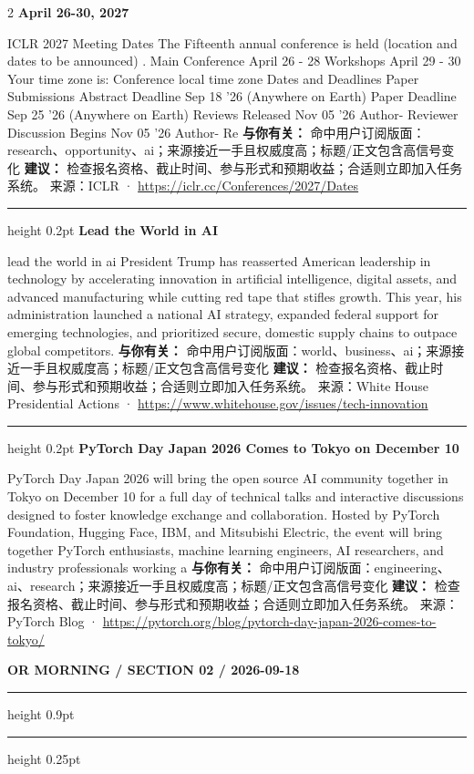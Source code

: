 \documentclass[10.5pt]{ctexart}
\begin{document}
\begin{multicols}{2}
{\large\bfseries April 26-30, 2027}\par
ICLR 2027 Meeting Dates The Fifteenth annual conference is held (location and dates to be announced) . Main Conference April 26 - 28 Workshops April 29 - 30 Your time zone is: Conference local time zone Dates and Deadlines Paper Submissions Abstract Deadline Sep 18 '26 (Anywhere on Earth) Paper Deadline Sep 25 '26 (Anywhere on Earth) Reviews Released Nov 05 '26 Author- Reviewer Discussion Begins Nov 05 '26 Author- Re
\textbf{与你有关：} 命中用户订阅版面：research、opportunity、ai；来源接近一手且权威度高；标题/正文包含高信号变化
\textbf{建议：} 检查报名资格、截止时间、参与形式和预期收益；合适则立即加入任务系统。
{\footnotesize\color{ormuted} 来源：ICLR · \url{https://iclr.cc/Conferences/2027/Dates}}
\vspace{2mm}
\hrule height 0.2pt
\vspace{2mm}
{\large\bfseries Lead the World in AI}\par
lead the world in ai President Trump has reasserted American leadership in technology by accelerating innovation in artificial intelligence, digital assets, and advanced manufacturing while cutting red tape that stifles growth. This year, his administration launched a national AI strategy, expanded federal support for emerging technologies, and prioritized secure, domestic supply chains to outpace global competitors.
\textbf{与你有关：} 命中用户订阅版面：world、business、ai；来源接近一手且权威度高；标题/正文包含高信号变化
\textbf{建议：} 检查报名资格、截止时间、参与形式和预期收益；合适则立即加入任务系统。
{\footnotesize\color{ormuted} 来源：White House Presidential Actions · \url{https://www.whitehouse.gov/issues/tech-innovation}}
\vspace{2mm}
\hrule height 0.2pt
\vspace{2mm}
{\large\bfseries PyTorch Day Japan 2026 Comes to Tokyo on December 10}\par
PyTorch Day Japan 2026 will bring the open source AI community together in Tokyo on December 10 for a full day of technical talks and interactive discussions designed to foster knowledge exchange and collaboration. Hosted by PyTorch Foundation, Hugging Face, IBM, and Mitsubishi Electric, the event will bring together PyTorch enthusiasts, machine learning engineers, AI researchers, and industry professionals working a
\textbf{与你有关：} 命中用户订阅版面：engineering、ai、research；来源接近一手且权威度高；标题/正文包含高信号变化
\textbf{建议：} 检查报名资格、截止时间、参与形式和预期收益；合适则立即加入任务系统。
{\footnotesize\color{ormuted} 来源：PyTorch Blog · \url{https://pytorch.org/blog/pytorch-day-japan-2026-comes-to-tokyo/}}
\end{multicols}
\newpage
{\small\bfseries OR MORNING / SECTION 02 / 2026-09-18}
\vspace{2mm}
\hrule height 0.9pt
\vspace{1.5mm}
\hrule height 0.25pt
\vspace{4mm}
\end{document}
